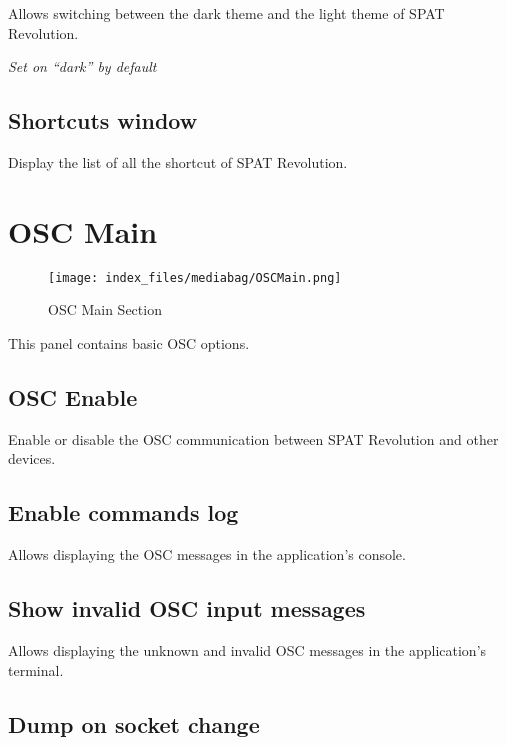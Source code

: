 \documentclass[
  letterpaper,
  DIV=11,
  numbers=noendperiod]{scrreport}
\begin{document}
Allows switching between the dark theme and the light theme of SPAT
Revolution.

\emph{Set on ``dark'' by default}

\hypertarget{shortcuts-window}{%
\subsection{Shortcuts window}\label{shortcuts-window}}

Display the list of all the shortcut of SPAT Revolution.

\hypertarget{osc-main}{%
\section{OSC Main}\label{osc-main}}

\begin{figure}

{\centering \texttt{[image: index\_files/mediabag/OSCMain.png]}

}

\caption{OSC Main Section}

\end{figure}

This panel contains basic OSC options.

\hypertarget{osc-enable}{%
\subsection{OSC Enable}\label{osc-enable}}

Enable or disable the OSC communication between SPAT Revolution and
other devices.

\hypertarget{enable-commands-log}{%
\subsection{Enable commands log}\label{enable-commands-log}}

Allows displaying the OSC messages in the application's console.

\hypertarget{show-invalid-osc-input-messages}{%
\subsection{Show invalid OSC input
messages}\label{show-invalid-osc-input-messages}}

Allows displaying the unknown and invalid OSC messages in the
application's terminal.

\hypertarget{dump-on-socket-change}{%
\subsection{Dump on socket change}\label{dump-on-socket-change}}
\end{document}
